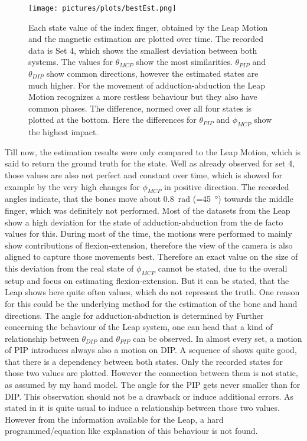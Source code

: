 \begin{figure}
\centering
\texttt{[image: pictures/plots/bestEst.png]}
\caption[Comparison of estimated states, which fit best to Leap data]
{Each state value of the index finger, obtained by the Leap Motion and the magnetic estimation are plotted over time. The recorded data is Set 4, which shows the smallest deviation between both systems. The values for $ \theta_{MCP} $ show the most similarities. $ \theta_{PIP} $ and $ \theta_{DIP} $ show common directions, however the estimated states are much higher. For the movement of adduction-abduction the Leap Motion recognizes a more restless behaviour but they also have common phases. The difference, normed over all four states is plotted at the bottom. Here the differences for $ \theta_{PIP} $ and $ \phi_{MCP} $ show the highest impact. }
\label{fig:bestLeap}
\end{figure}
Till now, the estimation results were only compared to the Leap Motion, which is said to return the ground truth for the state. Well as already observed for set 4, those values are also not perfect and constant over time, which is showed for example by the very high changes for $ \phi_{MCP} $ in positive direction. The recorded angles indicate, that the bones move about \SI{0.8}{\radian} (=\SI{45}{\degree}) towards the middle finger, which was definitely not performed. Most of the datasets from the Leap show a high deviation for the state of adduction-abduction from the de facto values for this. During most of the time, the motions were performed to mainly show contributions of flexion-extension, therefore the view of the camera is also aligned to capture those movements best. Therefore an exact value on the size of this deviation from the real state of $ \phi_{MCP} $ cannot be stated, due to the overall setup and focus on estimating flexion-extension. But it can be stated, that the Leap shows here quite often values, which do not represent the truth. One reason for this could be the underlying method for the estimation of the bone and hand directions. The angle for adduction-abduction is determined by 
Further concerning the behaviour of the Leap system, one can head that a kind of relationship between $ \theta_{DIP} $ and $ \theta_{PIP} $ can be observed. In almost every set, a motion of \ac{PIP} introduces always also a motion on \ac{DIP}. A sequence of  shows quite good, that there is a dependency between both states. Only the recorded states for those two values are plotted. However the connection between them is not static, as assumed by my hand model. The angle for the \ac{PIP} gets never smaller than for \ac{DIP}. This observation should not be a drawback or induce additional errors. As stated in  it is quite usual to induce a relationship between those two values. However from the information available for the Leap, a hard programmed/equation like explanation of this behaviour is not found. 
